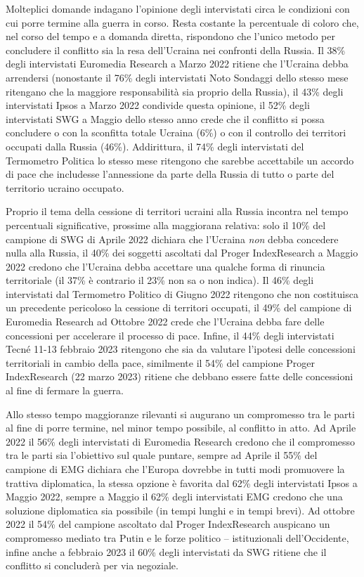 \documentclass[
]{book}
\begin{document}
Molteplici domande indagano l'opinione degli intervistati circa le condizioni con cui porre termine alla guerra in corso. Resta costante la percentuale di coloro che, nel corso del tempo e a domanda diretta, rispondono che l'unico metodo per concludere il conflitto sia la resa dell'Ucraina nei confronti della Russia. Il 38\% degli intervistati Euromedia Research a Marzo 2022 ritiene che l'Ucraina debba arrendersi (nonostante il 76\% degli intervistati Noto Sondaggi dello stesso mese ritengano che la maggiore responsabilità sia proprio della Russia), il 43\% degli intervistati Ipsos a Marzo 2022 condivide questa opinione, il 52\% degli intervistati SWG a Maggio dello stesso anno crede che il conflitto si possa concludere o con la sconfitta totale Ucraina (6\%) o con il controllo dei territori occupati dalla Russia (46\%). Addirittura, il 74\% degli intervistati del Termometro Politica lo stesso mese ritengono che sarebbe accettabile un accordo di pace che includesse l'annessione da parte della Russia di tutto o parte del territorio ucraino occupato.

Proprio il tema della cessione di territori ucraini alla Russia incontra nel tempo percentuali significative, prossime alla maggiorana relativa: solo il 10\% del campione di SWG di Aprile 2022 dichiara che l'Ucraina \emph{non} debba concedere nulla alla Russia, il 40\% dei soggetti ascoltati dal Proger IndexResearch a Maggio 2022 credono che l'Ucraina debba accettare una qualche forma di rinuncia territoriale (il 37\% è contrario il 23\% non sa o non indica). Il 46\% degli intervistati dal Termometro Politico di Giugno 2022 ritengono che non costituisca un precedente pericoloso la cessione di territori occupati, il 49\% del campione di Euromedia Research ad Ottobre 2022 crede che l'Ucraina debba fare delle concessioni per accelerare il processo di pace. Infine, il 44\% degli intervistati Tecné 11-13 febbraio 2023 ritengono che sia da valutare l'ipotesi delle concessioni territoriali in cambio della pace, similmente il 54\% del campione Proger IndexResearch (22 marzo 2023) ritiene che debbano essere fatte delle concessioni al fine di fermare la guerra.

Allo stesso tempo maggioranze rilevanti si augurano un compromesso tra le parti al fine di porre termine, nel minor tempo possibile, al conflitto in atto. Ad Aprile 2022 il 56\% degli intervistati di Euromedia Research credono che il compromesso tra le parti sia l'obiettivo sul quale puntare, sempre ad Aprile il 55\% del campione di EMG dichiara che l'Europa dovrebbe in tutti modi promuovere la trattiva diplomatica, la stessa opzione è favorita dal 62\% degli intervistati Ipsos a Maggio 2022, sempre a Maggio il 62\% degli intervistati EMG credono che una soluzione diplomatica sia possibile (in tempi lunghi e in tempi brevi). Ad ottobre 2022 il 54\% del campione ascoltato dal Proger IndexResearch auspicano un compromesso mediato tra Putin e le forze politico -- istituzionali dell'Occidente, infine anche a febbraio 2023 il 60\% degli intervistati da SWG ritiene che il conflitto si concluderà per via negoziale.
\end{document}
